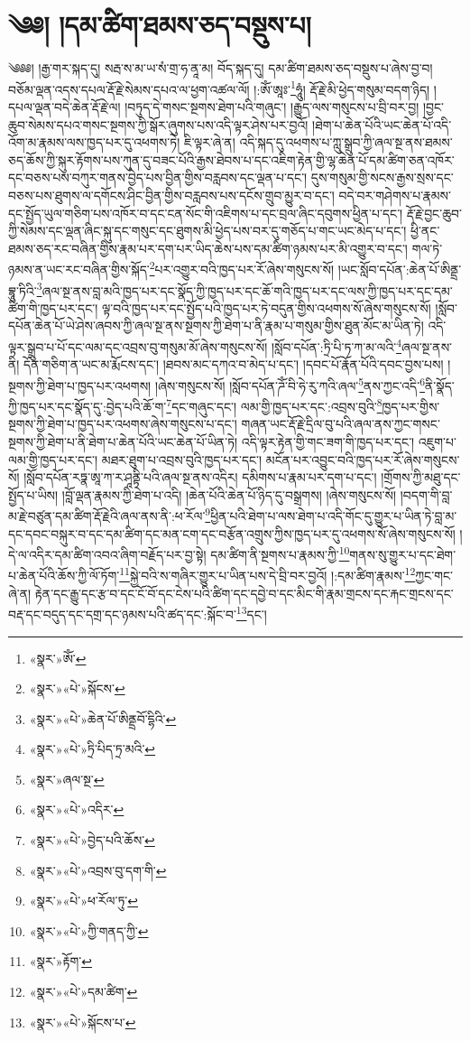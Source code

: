 \chapter{༄༅། །དམ་ཚིག་ཐམས་ཅད་བསྡུས་པ།}༄༅༅། །རྒྱ་གར་སྐད་དུ། སརྦ་ས་མ་ཡ་སཾ་གྲ་ཧ་ནཱ་མ། བོད་སྐད་དུ། དམ་ཚིག་ཐམས་ཅད་བསྡུས་པ་ཞེས་བྱ་བ། བཅོམ་ལྡན་འདས་དཔལ་རྡོ་རྗེ་སེམས་དཔའ་ལ་ཕྱག་འཚལ་ལོ། །:ཨོཾ་ཨཱཿ་\footnote{«སྣར་»ཨོཾ་}ཧཱུཾ། རྡོ་རྗེ་མི་ཕྱེད་གསུམ་བདག་ཉིད། །དཔལ་ལྡན་བདེ་ཆེན་རྡོ་རྗེ་ལ། །བཏུད་དེ་གསང་སྔགས་ཐེག་པའི་གཞུང་། །རྒྱུད་ལས་གསུངས་པ་བྲི་བར་བྱ། །བྱང་ཆུབ་སེམས་དཔའ་གསང་སྔགས་ཀྱི་སྒོར་ཞུགས་པས་འདི་ལྟར་ཤེས་པར་བྱའོ། །ཐེག་པ་ཆེན་པོའི་ཡང་ཆེན་པོ་འདི་འོག་མ་རྣམས་ལས་ཁྱད་པར་དུ་འཕགས་ཏེ། ཇི་ལྟར་ཞེ་ན། འདི་སྐད་དུ་འཕགས་པ་ཀླུ་སྒྲུབ་ཀྱི་ཞལ་སྔ་ནས་ཐམས་ཅད་ཆོས་ཀྱི་སྐུར་རྟོགས་པས་ཀུན་དུ་བཟང་པོའི་རྒྱས་ཐེབས་པ་དང་འཇིག་རྟེན་གྱི་ལྷ་ཆེན་པོ་དམ་ཚིག་ཅན་འཁོར་དང་བཅས་པས་བཀུར་གནས་བྱེད་པས་བྱིན་གྱིས་བརླབས་དང་ལྡན་པ་དང་། དུས་གསུམ་གྱི་སངས་རྒྱས་སྲས་དང་བཅས་པས་ཐུགས་ལ་དགོངས་ཤིང་བྱིན་གྱིས་བརླབས་པས་དངོས་གྲུབ་མྱུར་བ་དང་། བདེ་བར་གཤེགས་པ་རྣམས་དང་སྤྱོད་ཡུལ་གཅིག་པས་འཁོར་བ་དང་ངན་སོང་གི་འཇིགས་པ་དང་བྲལ་ཞིང་དབུགས་ཕྱིན་པ་དང་། རྡོ་རྗེ་བྱང་ཆུབ་ཀྱི་སེམས་དང་ལྡན་ཞིང་སྐུ་དང་གསུང་དང་ཐུགས་མི་ཕྱེད་པས་བར་དུ་གཅོད་པ་གང་ཡང་མེད་པ་དང་། ཕྱི་ནང་ཐམས་ཅད་རང་བཞིན་གྱིས་རྣམ་པར་དག་པར་ཡིད་ཆེས་པས་དམ་ཚིག་ཉམས་པར་མི་འགྱུར་བ་དང་། གལ་ཏེ་ཉམས་ན་ཡང་རང་བཞིན་གྱིས་སྐོད་\footnote{«སྣར་»«པེ་»སྐོངས་}པར་འགྱུར་བའི་ཁྱད་པར་རོ་ཞེས་གསུངས་སོ། །ཡང་སློབ་དཔོན་:ཆེན་པོ་ཨིནྡྲ་བྷཱུ་ཏིའི་\footnote{«སྣར་»«པེ་»ཆེན་པོ་ཨིནྡྲབོ་དྷིའི་}ཞལ་སྔ་ནས་བླ་མའི་ཁྱད་པར་དང་སྣོད་ཀྱི་ཁྱད་པར་དང་ཆོ་གའི་ཁྱད་པར་དང་ལས་ཀྱི་ཁྱད་པར་དང་དམ་ཚིག་གི་ཁྱད་པར་དང་། ལྟ་བའི་ཁྱད་པར་དང་སྤྱོད་པའི་ཁྱད་པར་ཏེ་བདུན་གྱིས་འཕགས་སོ་ཞེས་གསུངས་སོ། །སློབ་དཔོན་ཆེན་པོ་ཡེ་ཤེས་ཞབས་ཀྱི་ཞལ་སྔ་ནས་སྔགས་ཀྱི་ཐེག་པ་ནི་རྣམ་པ་གསུམ་གྱིས་ཐུན་མོང་མ་ཡིན་ཏེ། འདི་ལྟར་སྒྲུབ་པ་པོ་དང་ལམ་དང་འབྲས་བུ་གསུམ་མོ་ཞེས་གསུངས་སོ། །སློབ་དཔོན་:ཏྲི་པི་ཏ་ཀ་མ་ལའི་\footnote{«སྣར་»«པེ་»ཏྲི་པིད་ཏྲ་མའི་}ཞལ་སྔ་ནས་ནི། དོན་གཅིག་ན་ཡང་མ་རྨོངས་དང་། །ཐབས་མང་དཀའ་བ་མེད་པ་དང་། །དབང་པོ་རྣོན་པོའི་དབང་བྱས་པས། །སྔགས་ཀྱི་ཐེག་པ་ཁྱད་པར་འཕགས། །ཞེས་གསུངས་སོ། །སློབ་དཔོན་ཌོཾ་བི་ཧེ་རུ་ཀའི་ཞལ་\footnote{«སྣར་»ཞལ་སྔ་}ནས་ཀྱང་འདི་\footnote{«སྣར་»«པེ་»འདིར་}ནི་སྣོད་ཀྱི་ཁྱད་པར་དང་སྣོད་དུ་:བྱེད་པའི་ཆོ་ག་\footnote{«སྣར་»«པེ་»བྱེད་པའི་ཆོས་}དང་གཞུང་དང་། ལམ་གྱི་ཁྱད་པར་དང་:འབྲས་བུའི་\footnote{«སྣར་»«པེ་»འབྲས་བུ་དག་གི་}ཁྱད་པར་གྱིས་སྔགས་ཀྱི་ཐེག་པ་ཁྱད་པར་འཕགས་ཞེས་གསུངས་པ་དང་། གཞན་ཡང་རྡོ་རྗེ་དྲིལ་བུ་པའི་ཞལ་ནས་ཀྱང་གསང་སྔགས་ཀྱི་ཐེག་པ་ནི་ཐེག་པ་ཆེན་པོའི་ཡང་ཆེན་པོ་ཡིན་ཏེ། འདི་ལྟར་རྟེན་གྱི་གང་ཟག་གི་ཁྱད་པར་དང་། འཇུག་པ་ལམ་གྱི་ཁྱད་པར་དང་། མཐར་ཐུག་པ་འབྲས་བུའི་ཁྱད་པར་དང་། མངོན་པར་འབྱུང་བའི་ཁྱད་པར་རོ་ཞེས་གསུངས་སོ། །སློབ་དཔོན་རཏྣ་ཨཱ་ཀ་ར་ཤཱནྟི་པའི་ཞལ་སྔ་ནས་འདིར། དམིགས་པ་རྣམ་པར་དག་པ་དང་། །གྲོགས་ཀྱི་མཐུ་དང་སྤྱོད་པ་ཡིས། །བློ་ལྡན་རྣམས་ཀྱི་ཐེག་པ་འདི། །ཆེན་པོའི་ཆེན་པོ་ཉིད་དུ་བསྒྲགས། །ཞེས་གསུངས་སོ། །བདག་གི་བླ་མ་རྗེ་བཙུན་དམ་ཚིག་རྡོ་རྗེའི་ཞལ་ནས་ནི་:ཕ་རོལ་\footnote{«སྣར་»«པེ་»ཕ་རོལ་ཏུ་}ཕྱིན་པའི་ཐེག་པ་ལས་ཐེག་པ་འདི་གོང་དུ་གྱུར་པ་ཡིན་ཏེ་བླ་མ་དང་དབང་བསྐུར་བ་དང་དམ་ཚིག་དང་མན་ངག་དང་བརྩོན་འགྲུས་ཀྱིས་ཁྱད་པར་དུ་འཕགས་སོ་ཞེས་གསུངས་སོ། །དེ་ལ་འདིར་དམ་ཚིག་འབའ་ཞིག་བརྗོད་པར་བྱ་སྟེ། དམ་ཚིག་ནི་སྔགས་པ་རྣམས་ཀྱི་\footnote{«སྣར་»«པེ་»ཀྱི་གནད་ཀྱི་}གནས་སུ་གྱུར་པ་དང་ཐེག་པ་ཆེན་པོའི་ཆོས་ཀྱི་ལོ་ཏོག་\footnote{«སྣར་»རྟོག་}སྐྱེ་བའི་ས་གཞིར་གྱུར་པ་ཡིན་པས་དེ་བྲི་བར་བྱའོ། །:དམ་ཚིག་རྣམས་\footnote{«སྣར་»«པེ་»དམ་ཚིག་}ཀྱང་གང་ཞེ་ན། རྟེན་དང་རྒྱུ་དང་རྩ་བ་དང་ངོ་བོ་དང་ངེས་པའི་ཚིག་དང་དབྱེ་བ་དང་མིང་གི་རྣམ་གྲངས་དང་རྐང་གྲངས་དང་བརྡ་དང་བདུད་དང་དགྲ་དང་ཉམས་པའི་ཚད་དང་:སྐོང་བ་\footnote{«སྣར་»«པེ་»སྐོངས་པ་}དང་། 